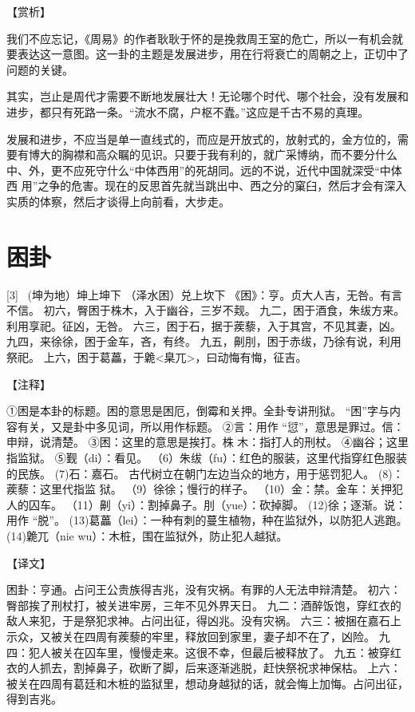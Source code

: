 \documentclass[12pt,UTF8]{ctexbook}
\begin{document}
【赏析】

我们不应忘记，《周易》的作者耿耿于怀的是挽救周王室的危亡，所以一有机会就要表达这一意图。这一卦的主题是发展进步，用在行将衰亡的周朝之上，正切中了问题的关键。

其实，岂止是周代才需要不断地发展壮大！无论哪个时代、哪个社会，没有发展和进步，都只有死路一条。“流水不腐，户枢不蠹。”这应是千古不易的真理。

发展和进步，不应当是单一直线式的，而应是开放式的，放射式的，金方位的，需要有博大的胸襟和高众瞩的见识。只要于我有利的，就广采博纳，而不要分什么中、外，更不应死守什么“中体西用”的死胡同。远的不说，近代中国就深受“中体西 用”之争的危害。现在的反思首先就当跳出中、西之分的窠臼，然后才会有深入实质的体察，然后才谈得上向前看，大步走。

\chapter{困卦}
[3] \ (坤为地）坤上坤下
（泽水困）兑上坎下
《困》：亨。贞大人吉，无咎。有言不信。
初六，臀困于株木，入于幽谷，三岁不觌。
九二，困于酒食，朱绂方来。利用享祀。征凶，无咎。
六三，困于石，据于蒺藜，入于其宫，不见其妻，凶。
九四，来徐徐，困于金车，吝，有终。
九五，劓刖，困于赤绂，乃徐有说，利用祭祀。
上六，困于葛藟，于臲<臬兀>，曰动悔有悔，征吉。

【注释】

①困是本卦的标题。困的意思是困厄，倒霉和关押。全卦专讲刑狱。 “困”字与内容有关，又是卦中多见词，所以用作标题。
②言：用作 “愆”，意思是罪过。信：申辩，说清楚。
③困：这里的意思是挨打。株 木：指打人的刑杖。
④幽谷；这里指监狱。
⑤觐（di）：看见。
（6）朱绂（fu）：红色的服装，这里代指穿红色服装的民族。
(7)石：嘉石。 古代树立在朝门左边当众的地方，用于惩罚犯人。
(8)：蒺藜：这里代指监 狱。
（9）徐徐；慢行的样子。
（10）金：禁。金车：关押犯人的囚车。
（11）劓（yi）：割掉鼻子。刖（yue）：砍掉脚。
(12)徐；逐渐。说：用作 “脱”。
(13)葛藟（lei）：一种有刺的蔓生植物，种在监狱外，以防犯人逃跑。
(14)臲兀（nie wu）：木桩，围在监狱外，防止犯人越狱。

【译文】

困卦：亨通。占问王公贵族得吉兆，没有灾祸。有罪的人无法申辩清楚。
初六：臀部挨了刑杖打，被关进牢房，三年不见外界天日。
九二：酒醉饭饱，穿红衣的敌人来犯，于是祭犯求神。占问出征，得凶兆。没有灾祸。
六三：被捆在嘉石上示众，又被关在四周有蒺藜的牢里，释放回到家里，妻子却不在了，凶险。
九四：犯人被关在囚车里，慢慢走来。这很不幸，但最后被释放了。
九五：被穿红衣的人抓去，割掉鼻子，砍断了脚，后来逐渐逃脱，赶快祭祝求神保枯。
上六：被关在四周有葛廷和木桩的监狱里，想动身越狱的话，就会悔上加悔。占问出征，得到吉兆。
\end{document}
